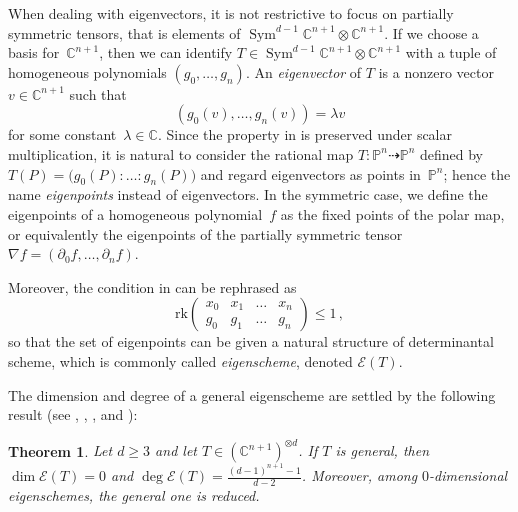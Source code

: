 \documentclass{amsart}
\theoremstyle{plain}
\newtheorem{theoremintro}{Theorem}
\theoremstyle{definition}
\newcommand{\C}{\mathbb{C}}
\newcommand{\p}{\mathbb{P}}
\newcommand{\de}{\partial}
\newcommand{\Eig}[1]{\mathcal{E}\!\left( {#1} \right)}
\newcommand{\Sym}{\operatorname{Sym}}
\newcommand{\rk}{\ensuremath{\mathrm{rk}}}
\begin{document}
When dealing with eigenvectors, it is not restrictive to focus on partially symmetric tensors, that is elements of $\Sym^{d-1}\C^{n+1} \otimes \C^{n+1}$.
If we choose a basis for~$\C^{n+1}$, then we can identify $T \in \Sym^{d-1}\C^{n+1} \otimes \C^{n+1}$ with a tuple of homogeneous polynomials $(g_0, \dotsc, g_n)$. An \emph{eigenvector} of $T$ is a nonzero vector $v \in \C^{n+1}$ such that
%
\begin{equation}
\label{eq:eigenvector_definition}
  (g_0(v), \dotsc, g_n(v)) = \lambda v
\end{equation}
%
for some constant~$\lambda \in \C$.
Since the property in  is preserved under scalar multiplication, 
it is natural to consider the rational map $T \colon \p^n \dashrightarrow \p^n$ defined by $T(P) = \bigl(g_0(P): \ldots: g_n(P)\bigr)$ 
and regard eigenvectors as points in~$\p^n$; hence the name \emph{eigenpoints} instead of eigenvectors. 
In the symmetric case, we define the eigenpoints of a homogeneous polynomial~$f$ as the fixed points of the polar map, 
or equivalently the eigenpoints of the partially symmetric tensor $\nabla f = (\de_0 f, \dotsc, \de_n f)$.

Moreover, the condition in  can be rephrased as 
\begin{equation}
\label{eq:def_matrix_general}
   \rk
   \begin{pmatrix}
     x_0 & x_1 & \dots & x_n \\
     g_0 & g_1 & \dots & g_n
   \end{pmatrix} \le 1 \,,
\end{equation}
so that the set of eigenpoints can be given a natural structure of determinantal scheme, which is commonly called \emph{eigenscheme}, denoted $\Eig{T}$.

The dimension and degree of a general eigenscheme are settled by the following result (see \cite[Theorem 2.1]{CartSturm}, \cite{ASS}, \cite{OO}, and \cite[Equation~5.2]{Abo}):

\begin{theoremintro}
\label{thm:nonempty}
Let $d \ge 3$ and let $T \in (\C^{n+1})^{\otimes d}$.
If $T$ is general, then $\dim \Eig{T}=0$ and $\deg \Eig{T}=\frac{(d-1)^{n+1}-1}{d-2}$.
Moreover, among $0$-dimensional eigenschemes, the general one is reduced.
\end{theoremintro}
\end{document}
